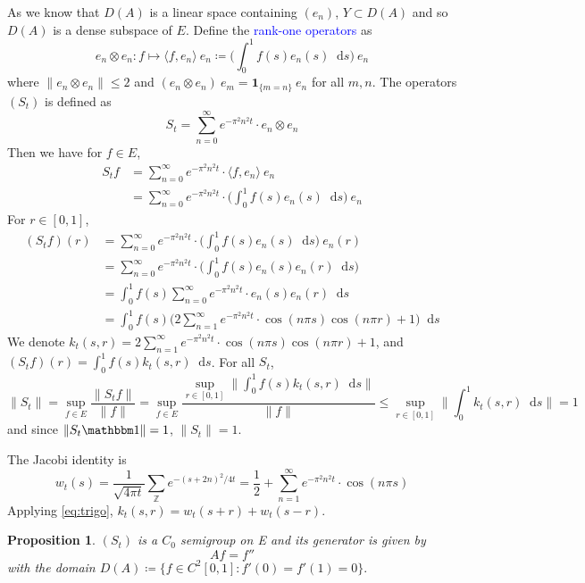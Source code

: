\documentclass[12pt, reqno]{amsart}
\renewcommand{\leq}{\leqslant}
\newcommand{\1}{\mathbbm 1}
\newcommand*\diff{\mathop{}\!\mathrm{d}}
\theoremstyle{plain}
\newtheorem{proposition}[theorem]{Proposition}
\theoremstyle{definition}
\newcommand{\navy}[1]{\textcolor{blue}{#1}}
\begin{document}
As we know that $D(A)$ is a linear space containing $(e_n)$, $Y\subset D(A)$ and so $D(A)$ is a dense subspace of $E.$ Define the \navy{rank-one operators} as
\begin{equation*}
e_n\otimes e_n\colon f\mapsto \big \langle f,e_n \big \rangle\ e_n\coloneq \Big (\int_{0}^{1}f(s)e_n(s)\diff s\Big)\ e_n
\end{equation*}
where $\|e_n\otimes e_n\| \leq 2$ and  $(e_n\otimes e_n)\ e_m=\mathbf{1}_{\{m=n\}}\ e_n$ for all $m,n$. The operators $(S_t)$ is defined as 
\begin{equation}\label{eq:diff-semi}
	S_t=\sum_{n=0}^{\infty} e^{-\pi^2n^2 t} \cdot e_n\otimes e_n
\end{equation}
Then we have for $f\in E$,
\begin{align*}
	S_tf&=\sum_{n=0}^{\infty} e^{-\pi^2n^2 t} \cdot \langle f,e_n \big \rangle\ e_n\\
	       &=\sum_{n=0}^{\infty} e^{-\pi^2n^2 t} \cdot \Big (\int_{0}^{1}f(s)e_n(s)\diff s\Big)\ e_n
\end{align*}
For $r\in [0,1]$, 
\begin{align*}
	(S_tf)(r)&=\sum_{n=0}^{\infty} e^{-\pi^2n^2 t} \cdot \Big (\int_{0}^{1}f(s)e_n(s)\diff s\Big)\ e_n(r)\\
	               &=\sum_{n=0}^{\infty} e^{-\pi^2n^2 t} \cdot \Big (\int_{0}^{1}f(s)e_n(s)e_n(r)\diff s\Big)\ \\
	               &=\int_{0}^{1}f(s)\sum_{n=0}^{\infty} e^{-\pi^2n^2 t} \cdot e_n(s)e_n(r)\diff s \\
	               &=\int_{0}^{1}f(s)\Big(2\sum_{n=1}^{\infty} e^{-\pi^2n^2 t} \cdot \cos(n\pi s)\cos(n\pi r)+1\Big)\diff s 	               
\end{align*}
We denote $k_t(s,r)=2\sum_{n=1}^{\infty} e^{-\pi^2n^2 t} \cdot \cos(n\pi s)\cos(n\pi r)+1$, and $(S_tf)(r)=\int_{0}^{1}f(s) k_t(s,r)\diff s $. For all $S_t$,
\begin{equation*}
	\|S_t\|=\sup_{f\in E}\frac{\|S_t f\|}{\|f\|}=\sup_{f\in E}\frac{\sup_{r\in [0,1]}\|\int_{0}^{1}f(s) k_t(s,r)\diff s \|}{\|f\|}\leq \sup_{r\in [0,1]}\|\int_{0}^{1}k_t(s,r)\diff s \|=1
\end{equation*}
and since $\|S_t\1\|=1$, $\|S_t\|=1.$

The Jacobi identity is 
\begin{equation*}
	w_t(s)=\frac{1}{\sqrt{4\pi t}}\sum_{\mathbb{Z}}e^{-(s+2n)^2/4t}=\frac{1}{2}+\sum_{n=1}^{\infty} e^{-\pi^2n^2 t} \cdot \cos(n\pi s)
\end{equation*}
Applying \eqref{eq:trigo}, $k_t(s,r)=w_t(s+r)+w_t(s-r)$. 
\begin{proposition}
	$(S_t)$ is a $C_0$ semigroup on E and its generator is given by
	\begin{equation*}
		Af=f''
	\end{equation*}
   with the domain $D(A)\coloneq\{f\in C^2[0,1]:f'(0)=f'(1)=0\}.$
\end{proposition}
\newpage


\end{document}
